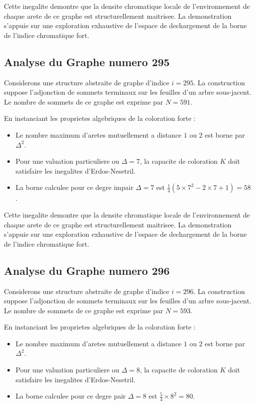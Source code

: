\documentclass[11pt,a4paper]{article}
\begin{document}
Cette inegalite demontre que la densite chromatique locale de l'environnement de chaque arete de ce graphe est structurellement maitrisee. La demonstration s'appuie sur une exploration exhaustive de l'espace de dechargement de la borne de l'indice chromatique fort.

\subsection{Analyse du Graphe numero 295}
Considerons une structure abstraite de graphe d'indice $i = 295$. La construction suppose l'adjonction de sommets terminaux sur les feuilles d'un arbre sous-jacent. Le nombre de sommets de ce graphe est exprime par $N = 591$.

En instanciant les proprietes algebriques de la coloration forte :
\begin{itemize}
\item Le nombre maximum d'aretes mutuellement a distance $1$ ou $2$ est borne par $\Delta^2$.
\item Pour une valuation particuliere ou $\Delta = 7$, la capacite de coloration $K$ doit satisfaire les inegalites d'Erdos-Nesetril.
\item La borne calculee pour ce degre impair $\Delta = 7$ est $\frac{1}{4}(5 \times 7^2 - 2 \times 7 + 1) = 58$.
\end{itemize}

Cette inegalite demontre que la densite chromatique locale de l'environnement de chaque arete de ce graphe est structurellement maitrisee. La demonstration s'appuie sur une exploration exhaustive de l'espace de dechargement de la borne de l'indice chromatique fort.

\subsection{Analyse du Graphe numero 296}
Considerons une structure abstraite de graphe d'indice $i = 296$. La construction suppose l'adjonction de sommets terminaux sur les feuilles d'un arbre sous-jacent. Le nombre de sommets de ce graphe est exprime par $N = 593$.

En instanciant les proprietes algebriques de la coloration forte :
\begin{itemize}
\item Le nombre maximum d'aretes mutuellement a distance $1$ ou $2$ est borne par $\Delta^2$.
\item Pour une valuation particuliere ou $\Delta = 8$, la capacite de coloration $K$ doit satisfaire les inegalites d'Erdos-Nesetril.
\item La borne calculee pour ce degre pair $\Delta = 8$ est $\frac{5}{4} \times 8^2 = 80$.
\end{itemize}
\end{document}
